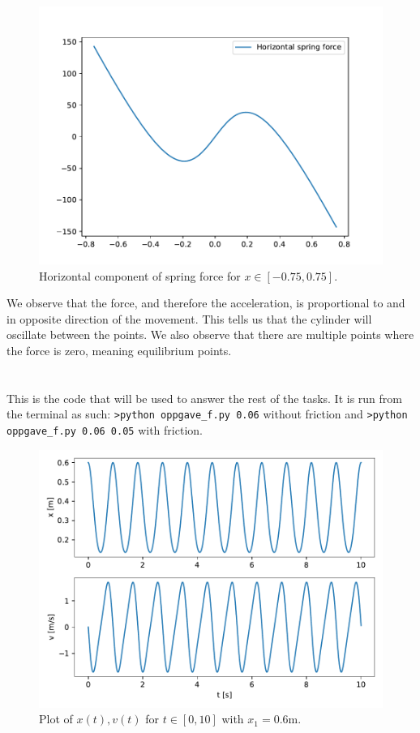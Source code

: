 \documentclass[a4paper,10pt,english]{article}
\begin{document}
\newpage
\begin{figure}[h]
    \centering
    \includegraphics[scale=0.85]{figure_e.pdf}
    \caption{Horizontal component of spring force for $x\in[-0.75, 0.75]$.}
    \label{fig:oppgave_e}
\end{figure}
We observe that the force, and therefore the acceleration, is proportional to and in opposite direction of the movement. This tells us that the cylinder will oscillate between the points. We also observe that there are multiple points where the force is zero, meaning equilibrium points. 

\newpage
\section{}
This is the code that will be used to answer the rest of the tasks. It is run from the terminal as such:
\verb|>python oppgave_f.py 0.06| without friction and \verb|>python oppgave_f.py 0.06 0.05| with friction.


\begin{figure}[h]
    \centering
    \includegraphics[scale=0.55]{figure_f.pdf}
    \caption{Plot of $x(t), v(t)$ for $t\in[0, 10]$ with $x_1=0.6$m.}
    \label{fig:figure_f}
\end{figure}
\end{document}
